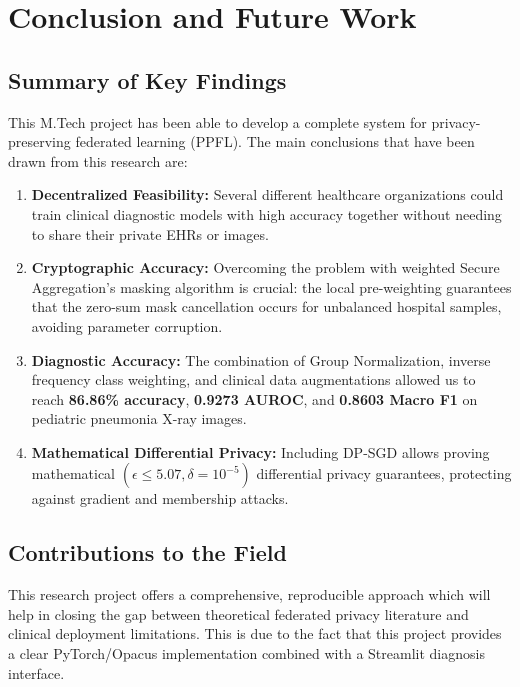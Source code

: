 \documentclass[12pt,a4paper]{report}
\begin{document}
\chapter{Conclusion and Future Work}
\label{chap:conclusion}

\section{Summary of Key Findings}
This M.Tech project has been able to develop a complete system for privacy-preserving federated learning (PPFL). The main conclusions that have been drawn from this research are:
\begin{enumerate}
    \item \textbf{Decentralized Feasibility:} Several different healthcare organizations could train clinical diagnostic models with high accuracy together without needing to share their private EHRs or images.
    \item \textbf{Cryptographic Accuracy:} Overcoming the problem with weighted Secure Aggregation's masking algorithm is crucial: the local pre-weighting guarantees that the zero-sum mask cancellation occurs for unbalanced hospital samples, avoiding parameter corruption.
    \item \textbf{Diagnostic Accuracy:} The combination of Group Normalization, inverse frequency class weighting, and clinical data augmentations allowed us to reach \textbf{86.86\% accuracy}, \textbf{0.9273 AUROC}, and \textbf{0.8603 Macro F1} on pediatric pneumonia X-ray images.
    \item \textbf{Mathematical Differential Privacy:} Including DP-SGD allows proving mathematical $(\epsilon \le 5.07, \delta = 10^{-5})$ differential privacy guarantees, protecting against gradient and membership attacks.
\end{enumerate}

\section{Contributions to the Field}
This research project offers a comprehensive, reproducible approach which will help in closing the gap between theoretical federated privacy literature and clinical deployment limitations. This is due to the fact that this project provides a clear PyTorch/Opacus implementation combined with a Streamlit diagnosis interface.
\end{document}
